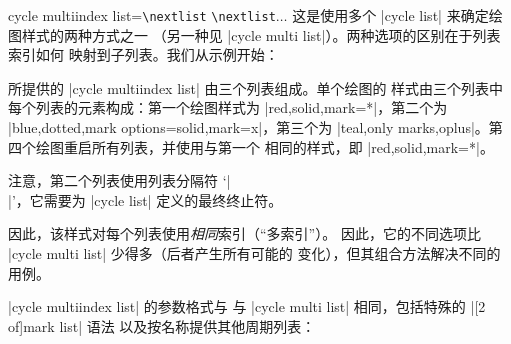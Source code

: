 \begin{pgfplotskey}{%
    cycle multiindex list=\texttt{\textbackslash nextlist}%
    \texttt{\textbackslash nextlist}$\ldots$
}
    这是使用多个 |cycle list| 来确定绘图样式的两种方式之一
    （另一种见 |cycle multi list|）。两种选项的区别在于列表索引如何
    映射到子列表。我们从示例开始：
\begin{codeexample}[]
\end{codeexample}
    \noindent 所提供的 |cycle multiindex list| 由三个列表组成。单个绘图的
    样式由三个列表中每个列表的元素构成：第一个绘图样式为
    |red,solid,mark=*|，第二个为
    |blue,dotted,mark options={solid},mark=x|，第三个为
    |teal,only marks,oplus|。第四个绘图重启所有列表，并使用与第一个
    相同的样式，即 |red,solid,mark=*|。

    注意，第二个列表使用列表分隔符 `|\\|'，它需要为 |cycle list|
    定义的最终终止符。

    因此，该样式对每个列表使用\emph{相同}索引（``多索引''）。
    因此，它的不同选项比 |cycle multi list| 少得多（后者产生所有可能的
    变化），但其组合方法解决不同的用例。

    |cycle multiindex list| 的参数格式与
    与 |cycle multi list| 相同，包括特殊的 |[2 of]mark list| 语法
    以及按名称提供其他周期列表：
\begin{codeexample}[]
\end{codeexample}


\end{pgfplotskey}
